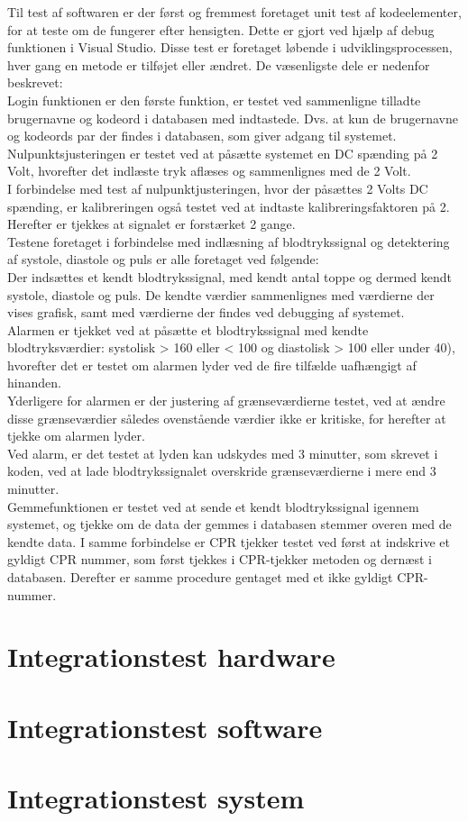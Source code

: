 Til test af softwaren er der først og fremmest foretaget unit test af  kodeelementer, for at teste om de fungerer efter hensigten. Dette er gjort ved hjælp af debug funktionen i Visual Studio. Disse test er foretaget løbende i udviklingsprocessen, hver gang en metode er tilføjet eller ændret. De væsenligste dele er nedenfor beskrevet: \\[1ex]
Login funktionen er den første funktion, er testet ved sammenligne tilladte brugernavne og kodeord i databasen med indtastede. Dvs. at kun de brugernavne og kodeords par der findes i databasen, som giver adgang til systemet.\\[1ex]
Nulpunktsjusteringen er testet ved at påsætte systemet en DC spænding på 2 Volt, hvorefter det indlæste tryk aflæses og sammenlignes med de 2 Volt. \\
I forbindelse med test af nulpunktjusteringen, hvor der påsættes 2 Volts DC spænding, er kalibreringen også testet ved at indtaste kalibreringsfaktoren på 2. Herefter er tjekkes at signalet er forstærket 2 gange.\\[1ex]
Testene foretaget i forbindelse med indlæsning af blodtrykssignal og detektering af systole, diastole og puls er alle foretaget ved følgende:\\
Der indsættes et kendt blodtrykssignal, med kendt antal toppe og dermed kendt systole, diastole og puls. De kendte værdier sammenlignes med værdierne der vises grafisk, samt med værdierne der findes ved debugging af systemet.\\[1ex]
Alarmen er tjekket ved at påsætte et blodtrykssignal med kendte blodtryksværdier: systolisk > 160 eller < 100 og diastolisk > 100 eller under 40), hvorefter det er testet om alarmen lyder ved de fire tilfælde uafhængigt af hinanden.\\ Yderligere for alarmen er der justering af grænseværdierne testet, ved at ændre disse grænseværdier således ovenstående værdier ikke er kritiske, for herefter at tjekke om alarmen lyder.\\ Ved alarm, er det testet at lyden kan udskydes med 3 minutter, som skrevet i koden, ved at lade blodtrykssignalet overskride grænseværdierne i mere end 3 minutter.\\[1ex]
Gemmefunktionen er testet ved at sende et kendt blodtrykssignal igennem systemet, og tjekke om de data der gemmes i databasen stemmer overen med de kendte data. I samme forbindelse er CPR tjekker testet ved først at indskrive et gyldigt CPR nummer, som først tjekkes i CPR-tjekker metoden og dernæst i databasen. Derefter er samme procedure gentaget med et ikke gyldigt CPR-nummer.


\section{Integrationstest hardware}


\section{Integrationstest software}

\section{Integrationstest system}
